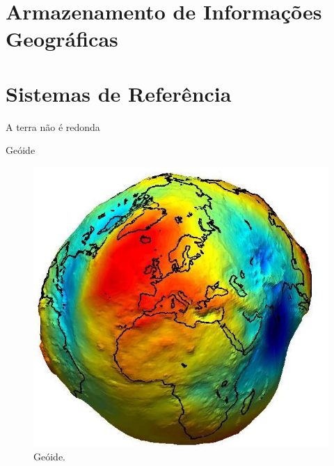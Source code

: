 \documentclass[9pt,ignorenonframetext,]{beamer}
\begin{document}
\hypertarget{armazenamento-de-informauxe7uxf5es-geogruxe1ficas}{%
\section{Armazenamento de Informações
Geográficas}\label{armazenamento-de-informauxe7uxf5es-geogruxe1ficas}}

\hypertarget{sistemas-de-referuxeancia}{%
\section{Sistemas de Referência}\label{sistemas-de-referuxeancia}}

\begin{frame}{A terra não é redonda}
\protect\hypertarget{a-terra-nuxe3o-uxe9-redonda}{}

\begin{block}{Geóide}

\begin{figure}[H]

{\centering \includegraphics[width=0.65\linewidth]{images/geoide} 

}

\caption{Geóide.}\label{fig:unnamed-chunk-5}
\end{figure}

\end{block}

\end{frame}
\end{document}
